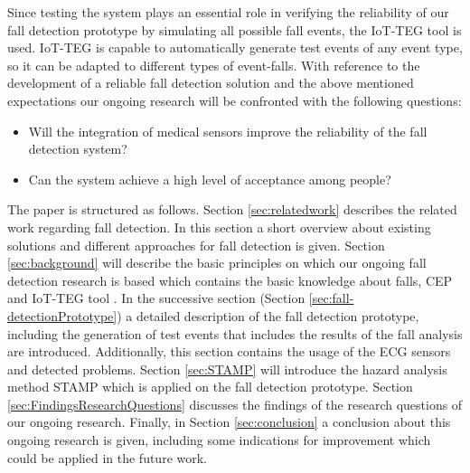 \documentclass[10pt,journal,compsoc]{IEEEtran}
\begin{document}
Since testing the system plays an essential role in verifying the reliability of our fall detection prototype by simulating all possible fall events, the IoT-TEG tool \cite{Gutierrez2017,TesisGutierrez2017} is used. IoT-TEG \cite{Gutierrez2017,TesisGutierrez2017} is capable to automatically generate test events of any event type, so it can be adapted to different types of event-falls.
With reference to the development of a reliable fall detection solution and the above mentioned expectations our ongoing research will be confronted with the following questions:
\begin{itemize}
	\item Will the integration of medical sensors improve the reliability of the fall detection system?
	\item Can the system achieve a high level of acceptance among people?	
\end{itemize}
The paper is structured as follows. Section \ref{sec:relatedwork} describes the related work regarding fall detection. In this section a short overview about existing solutions and different approaches for fall detection is given. Section \ref{sec:background} will describe the basic principles on which our ongoing fall detection research is based which contains the basic knowledge about falls, CEP \cite{Esper:2016} and IoT-TEG tool \cite{Gutierrez2017, TesisGutierrez2017}. In the successive section (Section \ref{sec:fall-detectionPrototype}) a detailed description of the fall detection prototype, including the generation of test events that includes the results of the fall analysis are introduced. Additionally, this section contains the usage of the ECG sensors and detected problems. Section \ref{sec:STAMP} will introduce the hazard analysis method STAMP \cite{leveson2011engineering} which is applied on the fall detection prototype. Section \ref{sec:FindingsResearchQuestions} discusses the findings of the research questions of our ongoing research. Finally, in Section \ref{sec:conclusion} a conclusion about this ongoing research is given, including some indications for improvement which could be applied in the future work.

 
\end{document}
